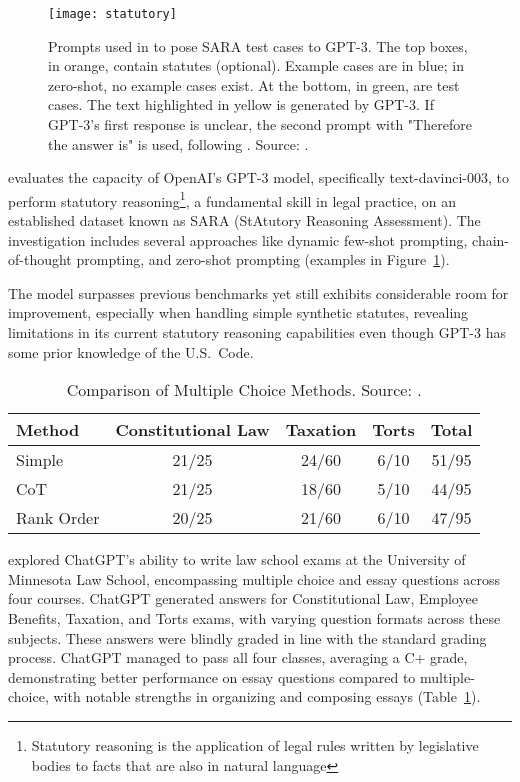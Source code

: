 \begin{figure}[!h]
	\centering
	\texttt{[image: statutory]}
	\caption{Prompts used in \textcite{blairstanek2023gpt3statutory} to pose SARA test cases to GPT-3. The top boxes, in orange, contain statutes (optional). Example cases are in blue; in zero-shot, no example cases exist. At the bottom, in green, are test cases. The text highlighted in yellow is generated by GPT-3. If GPT-3’s first response is unclear, the second prompt with "Therefore the answer is" is used, following \textcite{kojima2023large}. Source: \textcite{trautmann2022legalprompt}.}
	\label{fig:legal_prompting}
\end{figure}


\textcite{blairstanek2023gpt3statutory} evaluates the capacity of OpenAI's GPT-3 model, specifically text-davinci-003, to perform statutory reasoning\footnote{Statutory reasoning is the application of legal rules written by legislative bodies to facts that are also in natural language}, a fundamental skill in legal practice, on an established dataset known as SARA (StAtutory Reasoning Assessment).
The investigation includes several approaches like dynamic few-shot prompting, chain-of-thought prompting, and zero-shot prompting (examples in Figure~\ref{fig:legal_prompting}).

The model surpasses previous benchmarks yet still exhibits considerable room for improvement, especially when handling simple synthetic statutes, revealing limitations in its current statutory reasoning capabilities even though GPT-3 has some prior knowledge of the U.S.\ Code.

\begin{table}[!h]
	\centering
	\begin{tabularx}{\textwidth}{Xcccc}
		\toprule
		Method     & Constitutional Law & Taxation & Torts & Total \\
		\midrule
		Simple     & 21/25              & 24/60    & 6/10  & 51/95 \\
		CoT        & 21/25              & 18/60    & 5/10  & 44/95 \\
		Rank Order & 20/25              & 21/60    & 6/10  & 47/95 \\
		\bottomrule
	\end{tabularx}
	\caption{Comparison of Multiple Choice Methods. Source: \textcite{choi2023chatgptlaw}.}
	\label{tab:mc_comparison}
\end{table}

\textcite{choi2023chatgptlaw} explored ChatGPT's ability to write law school exams at the University of Minnesota Law School, encompassing multiple choice and essay questions across four courses.
ChatGPT generated answers for Constitutional Law, Employee Benefits, Taxation, and Torts exams, with varying question formats across these subjects.
These answers were blindly graded in line with the standard grading process.
ChatGPT managed to pass all four classes, averaging a C+ grade, demonstrating better performance on essay questions compared to multiple-choice, with notable strengths in organizing and composing essays (Table~\ref{tab:mc_comparison}).

